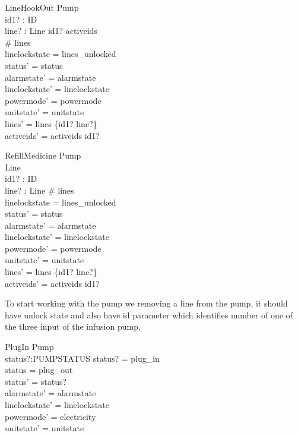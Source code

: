 \documentclass{article}
\begin{document}
	\begin{schema}{LineHookOut}
		\Delta Pump \\
		id1? : ID \\
		line? : Line
	\where
		id1? \in activeids \\
		\# lines  \\
		linelockstate = lines_unlocked \\
		status' = status \\
		alarmstate' = alarmstate \\
		linelockstate' = linelockstate \\
		powermode' =  powermode \\
		unitstate' = unitstate \\
		lines' = lines \setminus \{id1? \mapsto line?\} \\
		activeids' = activeids \setminus id1?
	\end{schema}
	
	\begin{schema}{RefillMedicine}
		\Delta Pump \\
		\Delta Line \\
		id1? : ID \\
		line? : Line
	\where
		\# lines  \\
		linelockstate = lines_unlocked \\
		status' = status \\
		alarmstate' = alarmstate \\
		linelockstate' = linelockstate \\
		powermode' =  powermode \\
		unitstate' = unitstate \\
		lines' = lines \setminus \{id1? \mapsto line?\} \\
		activeids' = activeids \setminus id1?
	\end{schema}
	
	To start working with the pump we removing a line from the pump, it should have unlock state
	and also have id parameter which identifies number of one of the
	three input of the infusion pump.	
	
	\begin{schema}{PlugIn}
		\Delta Pump\\
		status?:PUMPSTATUS
	\where
		status? = plug\_in \\
		status = plug\_out \\
		status' = status? \\
		alarmstate' = alarmstate \\
		linelockstate' = linelockstate \\
		powermode' =  electricity \\
		unitstate' = unitstate \\
	\end{schema}
	
\end{document}
